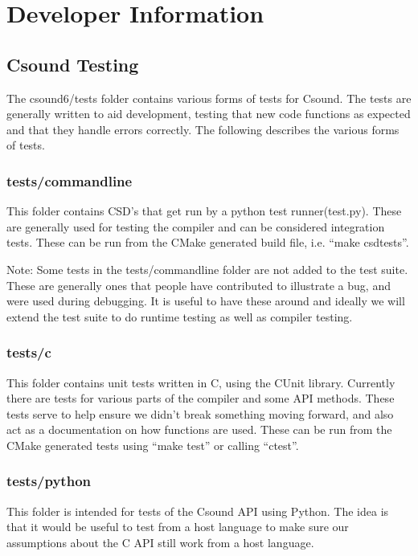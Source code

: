 \documentclass[]{book}
\begin{document}
\chapter{Developer Information}

\section{Csound Testing}

The csound6/tests folder contains various forms of tests for Csound. The
tests are generally written to aid development, testing that new code
functions as expected and that they handle errors correctly. The
following describes the various forms of tests.

\subsection{tests/commandline}

This folder contains CSD's that get run by a python test
runner(test.py). These are generally used for testing the compiler and
can be considered integration tests. These can be run from the CMake
generated build file, i.e. ``make csdtests''.

Note: Some tests in the tests/commandline folder are not added to the
test suite. These are generally ones that people have contributed to
illustrate a bug, and were used during debugging. It is useful to have
these around and ideally we will extend the test suite to do runtime
testing as well as compiler testing.

\subsection{tests/c}

This folder contains unit tests written in C, using the CUnit library.
Currently there are tests for various parts of the compiler and some API
methods. These tests serve to help ensure we didn't break something
moving forward, and also act as a documentation on how functions are
used. These can be run from the CMake generated tests using ``make
test'' or calling ``ctest''.

\subsection{tests/python}

This folder is intended for tests of the Csound API using Python. The
idea is that it would be useful to test from a host language to make
sure our assumptions about the C API still work from a host language.
\end{document}
